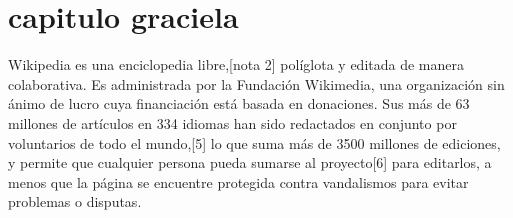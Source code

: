 \section{capitulo graciela}
Wikipedia es una enciclopedia libre,[nota 2]​ políglota y editada de manera colaborativa. Es administrada por la Fundación Wikimedia, una organización sin ánimo de lucro cuya financiación está basada en donaciones. Sus más de 63 millones de artículos en 334 idiomas han sido redactados en conjunto por voluntarios de todo el mundo,[5]​ lo que suma más de 3500 millones de ediciones, y permite que cualquier persona pueda sumarse al proyecto[6]​ para editarlos, a menos que la página se encuentre protegida contra vandalismos para evitar problemas o disputas.
